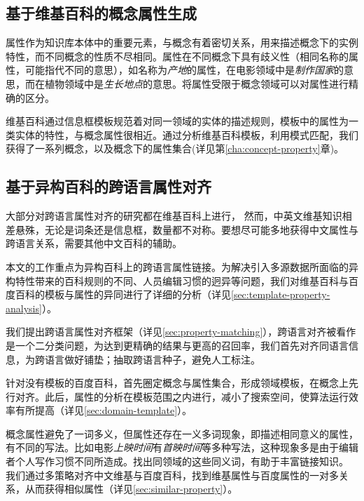 \subsection{基于维基百科的概念属性生成}
属性作为知识库本体中的重要元素，与概念有着密切关系，用来描述概念下的实例特性，而不同概念的性质不尽相同。属性在不同概念下具有歧义性（相同名称的属性，可能指代不同的意思），如名称为\textit{产地}的属性，在电影领域中是\textit{制作国家}的意思，而在植物领域中是\textit{生长地点}的意思。将属性受限于概念领域可以对属性进行精确的区分。

维基百科通过{\heiti 信息框模板}规范着对同一领域的实体的描述规则，模板中的属性为一类实体的特性，与概念属性很相近。通过分析维基百科模板，利用模式匹配，我们获得了一系列概念，以及概念下的属性集合(详见第\ref{cha:concept-property}章)。


\subsection{基于异构百科的跨语言属性对齐}
大部分对跨语言属性对齐的研究都在维基百科上进行，
然而，中英文维基知识相差悬殊，无论是词条还是信息框，数量都不对称。要想尽可能多地获得中文属性与跨语言关系，需要其他中文百科的辅助。

本文的工作重点为异构百科上的跨语言属性链接。为解决引入多源数据所面临的异构特性带来的百科规则的不同、人员编辑习惯的迥异等问题，我们对维基百科与百度百科的模板与属性的异同进行了详细的分析（详见\ref{sec:template-property-analysis}）。

我们提出跨语言属性对齐框架（详见\ref{sec:property-matching}），跨语言对齐被看作是一个二分类问题，为达到更精确的结果与更高的召回率，我们首先对齐同语言信息，为跨语言做好铺垫；抽取跨语言种子，避免人工标注。

针对没有模板的百度百科，首先圈定概念与属性集合，形成领域模板，在概念上先行对齐。此后，属性的分析在模板范围之内进行，减小了搜索空间，使算法运行效率有所提高（详见\ref{sec:domain-template}）。

概念属性避免了一词多义，但属性还存在一义多词现象，即描述相同意义的属性，有不同的写法。比如电影\textit{上映时间}有\textit{首映时间}等多种写法，这种现象多是由于编辑者个人写作习惯不同所造成。找出同领域的这些同义词，有助于丰富链接知识。
我们通过多策略对齐中文维基与百度百科，找到维基属性与百度属性的一对多关系，从而获得相似属性（详见\ref{sec:similar-property}）。

